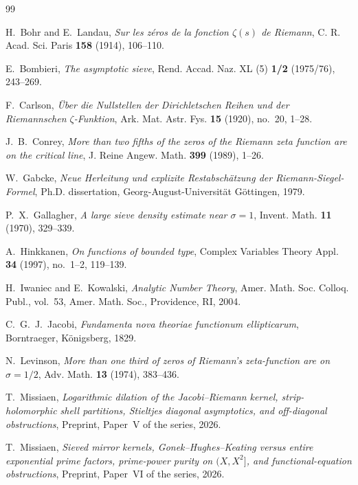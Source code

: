 \documentclass[11pt,reqno]{amsart}
\theoremstyle{definition}
\theoremstyle{remark}
\numberwithin{equation}{section}
\begin{document}
\begin{thebibliography}{99}

H.~Bohr and E.~Landau,
\emph{Sur les z\'eros de la fonction $\zeta(s)$ de Riemann},
C. R. Acad. Sci. Paris \textbf{158} (1914), 106--110.

E.~Bombieri,
\emph{The asymptotic sieve},
Rend. Accad. Naz. XL (5) \textbf{1/2} (1975/76), 243--269.

F.~Carlson,
\emph{\"Uber die Nullstellen der Dirichletschen Reihen und der Riemannschen $\zeta$-Funktion},
Ark. Mat. Astr. Fys. \textbf{15} (1920), no.~20, 1--28.

J.~B.~Conrey,
\emph{More than two fifths of the zeros of the Riemann zeta function are on the critical line},
J. Reine Angew. Math. \textbf{399} (1989), 1--26.

W.~Gabcke,
\emph{Neue Herleitung und explizite Restabsch\"atzung der Riemann-Siegel-Formel},
Ph.D. dissertation, Georg-August-Universit\"at G\"ottingen, 1979.

P.~X.~Gallagher,
\emph{A large sieve density estimate near $\sigma = 1$},
Invent. Math. \textbf{11} (1970), 329--339.

A.~Hinkkanen,
\emph{On functions of bounded type},
Complex Variables Theory Appl. \textbf{34} (1997), no.~1--2, 119--139.

H.~Iwaniec and E.~Kowalski,
\emph{Analytic Number Theory},
Amer. Math. Soc. Colloq. Publ., vol.~53, Amer. Math. Soc., Providence, RI, 2004.

C.~G.~J.~Jacobi,
\emph{Fundamenta nova theoriae functionum ellipticarum},
Borntraeger, K\"onigsberg, 1829.

N.~Levinson,
\emph{More than one third of zeros of Riemann's zeta-function are on $\sigma = 1/2$},
Adv. Math. \textbf{13} (1974), 383--436.

T.~Missiaen,
\emph{Logarithmic dilation of the Jacobi--Riemann kernel, strip-holomorphic shell partitions, Stieltjes diagonal asymptotics, and off-diagonal obstructions},
Preprint, Paper~V of the series, 2026.

T.~Missiaen,
\emph{Sieved mirror kernels, Gonek--Hughes--Keating versus entire exponential prime factors, prime-power purity on $(X, X^2]$, and functional-equation obstructions},
Preprint, Paper~VI of the series, 2026.


\end{thebibliography}
\end{document}

